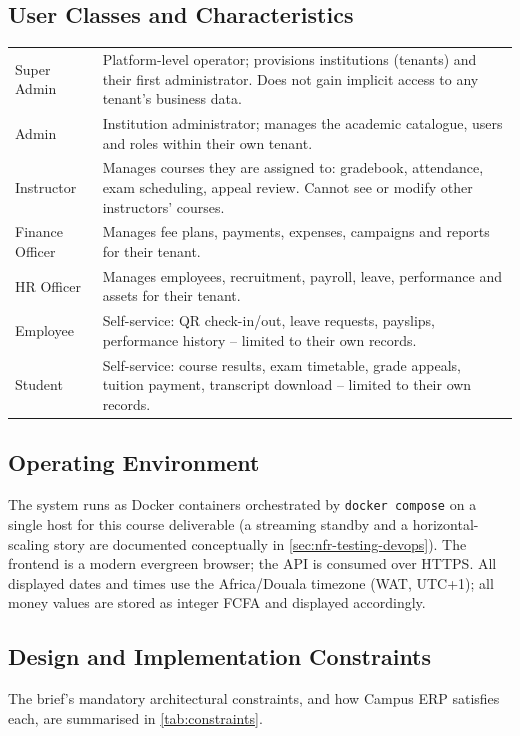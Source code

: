 \subsection{User Classes and Characteristics}
\begin{longtable}{L{2.6cm}L{11.5cm}}
  \toprule
   &  \\
  \midrule
  \endhead
  Super Admin & Platform-level operator; provisions institutions (tenants) and
    their first administrator. Does not gain implicit access to any tenant's
    business data. \\
  Admin & Institution administrator; manages the academic catalogue, users and
    roles within their own tenant. \\
  Instructor & Manages courses they are assigned to: gradebook, attendance,
    exam scheduling, appeal review. Cannot see or modify other instructors'
    courses. \\
  Finance Officer & Manages fee plans, payments, expenses, campaigns and
    reports for their tenant. \\
  HR Officer & Manages employees, recruitment, payroll, leave, performance and
    assets for their tenant. \\
  Employee & Self-service: QR check-in/out, leave requests, payslips,
    performance history -- limited to their own records. \\
  Student & Self-service: course results, exam timetable, grade appeals,
    tuition payment, transcript download -- limited to their own records. \\
  \bottomrule
\end{longtable}

\subsection{Operating Environment}
The system runs as Docker containers orchestrated by \texttt{docker compose}
on a single host for this course deliverable (a streaming standby and a
horizontal-scaling story are documented conceptually in
\cref{sec:nfr-testing-devops}). The frontend is a modern evergreen browser;
the API is consumed over HTTPS. All displayed dates and times use the
Africa/Douala timezone (WAT, UTC+1); all money values are stored as integer
FCFA and displayed accordingly.

\subsection{Design and Implementation Constraints}
The brief's mandatory architectural constraints, and how Campus ERP satisfies
each, are summarised in \cref{tab:constraints}.

